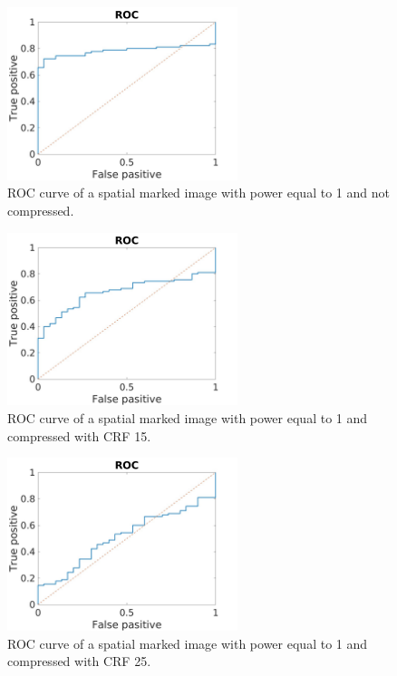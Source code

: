 \begin{figure}[h!]
\centering
\includegraphics[width=0.6\textwidth]{./img/ROC/ROC_gauss_1_1.jpg}
\caption{\small{ROC curve of a spatial marked image with power equal to 1 and not compressed.}}
\label{fig:g1crf1}
\end{figure}
\begin{figure}[h!]
\centering
\includegraphics[width=0.6\textwidth]{./img/ROC/ROC_gauss_1_15.jpg}
\caption{\small{ROC curve of a spatial marked image with power equal to 1 and compressed with CRF 15.}}
\label{fig:g1crf15}
\end{figure}
\begin{figure}[h!]
\centering
\includegraphics[width=0.6\textwidth]{./img/ROC/ROC_gauss_1_25.jpg}
\caption{\small{ROC curve of a spatial marked image with power equal to 1 and compressed with CRF 25.}}
\label{fig:g1crf25}
\end{figure}
